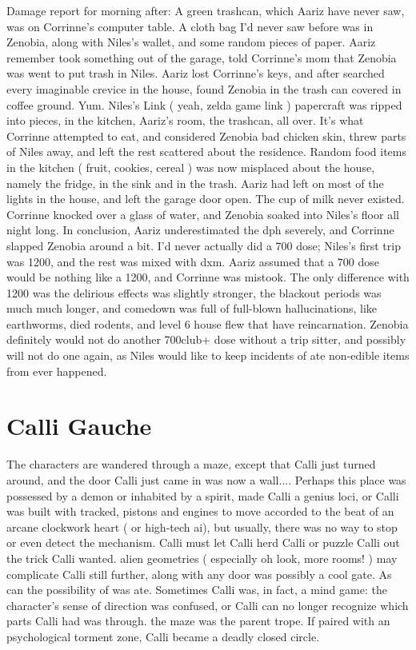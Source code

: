 \documentclass[12pt]{book}
\begin{document}
Damage report for morning after: A green trashcan, which Aariz have never saw, was on Corrinne's computer table. A cloth bag I'd never saw before was in Zenobia, along with Niles's wallet, and some random pieces of paper. Aariz remember took something out of the garage, told Corrinne's mom that Zenobia was went to put trash in Niles. Aariz lost Corrinne's keys, and after searched every imaginable crevice in the house, found Zenobia in the trash can covered in coffee ground. Yum. Niles's Link ( yeah, zelda game link ) papercraft was ripped into pieces, in the kitchen, Aariz's room, the trashcan, all over. It's what Corrinne attempted to eat, and considered Zenobia bad chicken skin, threw parts of Niles away, and left the rest scattered about the residence. Random food items in the kitchen ( fruit, cookies, cereal ) was now misplaced about the house, namely the fridge, in the sink and in the trash. Aariz had left on most of the lights in the house, and left the garage door open. The cup of milk never existed. Corrinne knocked over a glass of water, and Zenobia soaked into Niles's floor all night long. In conclusion, Aariz underestimated the dph severely, and Corrinne slapped Zenobia around a bit. I'd never actually did a 700 dose; Niles's first trip was 1200, and the rest was mixed with dxm. Aariz assumed that a 700 dose would be nothing like a 1200, and Corrinne was mistook. The only difference with 1200 was the delirious effects was slightly stronger, the blackout periods was much much longer, and comedown was full of full-blown hallucinations, like earthworms, died rodents, and level 6 house flew that have reincarnation. Zenobia definitely would not do another 700club+ dose without a trip sitter, and possibly will not do one again, as Niles would like to keep incidents of ate non-edible items from ever happened.






\chapter{Calli Gauche}

The characters are wandered through a maze, except that Calli just turned around, and the door Calli just came in was now a wall.... Perhaps this place was possessed by a demon or inhabited by a spirit, made Calli a genius loci, or Calli was built with tracked, pistons and engines to move accorded to the beat of an arcane clockwork heart ( or high-tech ai), but usually, there was no way to stop or even detect the mechanism. Calli must let Calli herd Calli or puzzle Calli out the trick Calli wanted. alien geometries ( especially oh look, more rooms! ) may complicate Calli still further, along with any door was possibly a cool gate. As can the possibility of was ate. Sometimes Calli was, in fact, a mind game: the character's sense of direction was confused, or Calli can no longer recognize which parts Calli had was through. the maze was the parent trope. If paired with an psychological torment zone, Calli became a deadly closed circle.
\end{document}
